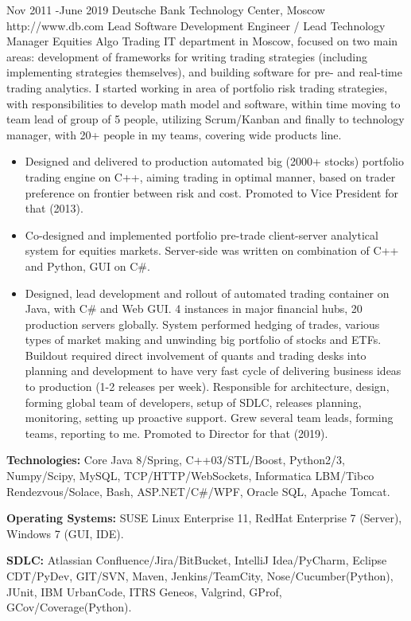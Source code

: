 \documentclass[10pt]{article} %
\begin{document}
\clearpage

\job
{Nov 2011 -}{June 2019}
{Deutsche Bank Technology Center, Moscow}
{http://www.db.com}
{Lead Software Development Engineer / Lead Technology Manager}
{Equities Algo Trading IT department in Moscow, focused on two main areas: development of frameworks for
writing trading strategies (including implementing strategies themselves), and building software 
for pre- and real-time  trading analytics. I started working in area of portfolio risk trading strategies,
with responsibilities to develop math model and software, within time moving to team lead of group of 5 people,
utilizing Scrum/Kanban and finally to technology manager, with 20+ people in my teams,
covering wide products line.}
{\begin{itemize}
\item{Designed and delivered to production automated big (2000+ stocks) portfolio trading engine on C++,
aiming trading in optimal manner, based on trader preference on frontier between risk and cost. 
Promoted to Vice President for that (2013).}
\item{Co-designed and implemented portfolio pre-trade client-server analytical system for equities markets.
Server-side was written on combination of C++ and Python, GUI on C\#.}
\item{Designed, lead development and rollout of automated trading container on Java, with C\# and Web GUI.
4 instances in major financial hubs, 20 production servers globally. System performed hedging of trades,
various types of market making and unwinding big portfolio of stocks and ETFs. Buildout required direct
involvement of quants and trading desks into planning and development to have very fast cycle of delivering
business ideas to production (1-2 releases per week). Responsible for architecture, design, forming
global team of developers, setup of SDLC, releases planning, monitoring, setting up proactive support.
Grew several team leads, forming teams, reporting to me. Promoted to Director for that (2019).}
\end{itemize}}
{\rule{0mm}{5mm}\textbf{Technologies:} Core Java 8/Spring, C++03/STL/Boost, Python2/3, Numpy/Scipy, MySQL, TCP/HTTP/WebSockets,
Informatica LBM/Tibco Rendezvous/Solace, Bash, ASP.NET/C\#/WPF, Oracle SQL, Apache Tomcat.\\
\rule{0mm}{5mm}\textbf{Operating Systems:} SUSE Linux Enterprise 11, RedHat Enterprise 7 (Server), Windows 7 (GUI, IDE).\\
\rule{0mm}{5mm}\textbf{SDLC:} Atlassian Confluence/Jira/BitBucket, IntelliJ Idea/PyCharm, Eclipse CDT/PyDev, GIT/SVN,
Maven, Jenkins/TeamCity, Nose/Cucumber(Python), JUnit, IBM UrbanCode, ITRS Geneos, Valgrind, GProf, GCov/Coverage(Python).
}
\end{document}
